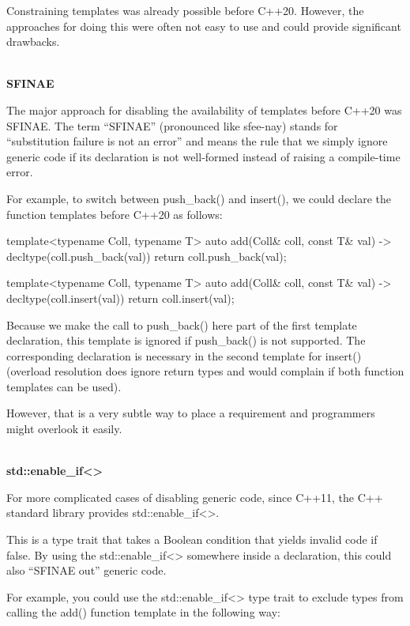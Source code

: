 
Constraining templates was already possible before C++20. However, the approaches for doing this were often not easy to use and could provide significant drawbacks.

\noindent
\hspace*{\fill} \\ %
\textbf{SFINAE}

The major approach for disabling the availability of templates before C++20 was SFINAE. The term “SFINAE” (pronounced like sfee-nay) stands for “substitution failure is not an error” and means the rule that we simply ignore generic code if its declaration is not well-formed instead of raising a compile-time error.

For example, to switch between push\_back() and insert(), we could declare the function templates before C++20 as follows:

\begin{cpp}
template<typename Coll, typename T>
auto add(Coll& coll, const T& val) -> decltype(coll.push_back(val))
{
	return coll.push_back(val);
}

template<typename Coll, typename T>
auto add(Coll& coll, const T& val) -> decltype(coll.insert(val))
{
	return coll.insert(val);
}
\end{cpp}

Because we make the call to push\_back() here part of the first template declaration, this template is ignored if push\_back() is not supported. The corresponding declaration is necessary in the second template for insert() (overload resolution does ignore return types and would complain if both function templates can be used).

However, that is a very subtle way to place a requirement and programmers might overlook it easily.

\noindent
\hspace*{\fill} \\ %
\textbf{std::enable\_if<>}

For more complicated cases of disabling generic code, since C++11, the C++ standard library provides std::enable\_if<>.

This is a type trait that takes a Boolean condition that yields invalid code if false. By using the std::enable\_if<> somewhere inside a declaration, this could also “SFINAE out” generic code.

For example, you could use the std::enable\_if<> type trait to exclude types from calling the add() function template in the following way:

